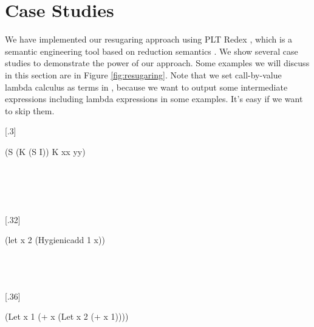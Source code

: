 \section{Case Studies}
\label{sec4}


We have implemented our resugaring approach using PLT Redex \cite{SEwPR}, which is a semantic engineering tool based on reduction semantics \cite{reduction}. We show several case studies to demonstrate the power of our approach. Some examples we will discuss in this section are in Figure \ref{fig:resugaring}. Note that we set call-by-value lambda calculus as terms in , because we want to output some intermediate expressions including lambda expressions in some examples. It's easy if we want to skip them.

\begin{figure*}[t]
\centering
{}[.3\linewidth]{
\begin{flushleft}
{\scriptsize
\begin{Codes}
\qquad (S (K (S I)) K xx yy)\\
\\
\\
\\
\\

\end{Codes}
}
\end{flushleft}
}
[.32\linewidth]{
\begin{flushleft}
{\scriptsize
\begin{Codes}
\qquad    (let x 2 (Hygienicadd 1 x))\\
\\
\\
\\

\end{Codes}

}
\end{flushleft}
}
[.36\linewidth]{
\begin{flushleft}
{\scriptsize
\begin{Codes}
\qquad    (Let x 1 (+ x (Let x 2 (+ x 1))))\\
\\
\\
\\
\\
\end{Codes}
}
\end{flushleft}
}


\end{figure*}
